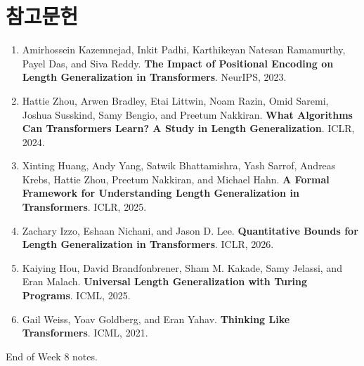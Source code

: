 \documentclass[11pt,a4paper,oneside,openany]{memoir}
\theoremstyle{definition}
\begin{document}
\chapter*{참고문헌}

\small

\begin{enumerate}[leftmargin=1.8em,itemsep=0.55em]
\item Amirhossein Kazemnejad, Inkit Padhi, Karthikeyan Natesan Ramamurthy, Payel Das, and Siva Reddy. 
\textbf{The Impact of Positional Encoding on Length Generalization in Transformers}. NeurIPS, 2023.

\item Hattie Zhou, Arwen Bradley, Etai Littwin, Noam Razin, Omid Saremi, Joshua Susskind, Samy Bengio, and Preetum Nakkiran.
\textbf{What Algorithms Can Transformers Learn? A Study in Length Generalization}. ICLR, 2024.

\item Xinting Huang, Andy Yang, Satwik Bhattamishra, Yash Sarrof, Andreas Krebs, Hattie Zhou, Preetum Nakkiran, and Michael Hahn.
\textbf{A Formal Framework for Understanding Length Generalization in Transformers}. ICLR, 2025.

\item Zachary Izzo, Eshaan Nichani, and Jason D. Lee.
\textbf{Quantitative Bounds for Length Generalization in Transformers}. ICLR, 2026.

\item Kaiying Hou, David Brandfonbrener, Sham M. Kakade, Samy Jelassi, and Eran Malach.
\textbf{Universal Length Generalization with Turing Programs}. ICML, 2025.

\item Gail Weiss, Yoav Goldberg, and Eran Yahav.
\textbf{Thinking Like Transformers}. ICML, 2021.
\end{enumerate}

\vfill
\begin{center}
\footnotesize
End of Week 8 notes.
\end{center}
\end{document}
